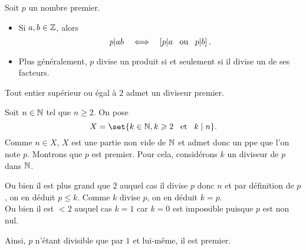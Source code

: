 \documentclass{magnolia}
\begin{document}


\begin{proposition}
Soit $p$ un nombre premier.
\begin{itemize}
\item Si $a,b\in\mathbb{Z}$, alors
  \[p|ab \quad\Longleftrightarrow\quad \left[p|a \quad\!\text{ou}\quad\! p|b\right].\]
\item Plus généralement, $p$ divise un produit si et seulement si il divise
  un de ses facteurs.
\end{itemize}
\end{proposition}

\begin{proposition}
Tout entier supérieur ou égal à $2$ admet un diviseur premier.  
\end{proposition}

\begin{preuve}
Soit $n\in \mathbb{N}$ tel que $n\geq 2$.
On pose $$X=\set{k\in \N, k\geq 2 \et k\mid n}.$$
Comme $n\in X$, $X$ est une partie non vide de $\mathbb{N}$ et admet donc un ppe que l'on note $p$. Montrons que $p$ est premier. Pour cela, considérons $k$ un diviseur de $p$ dans $\mathbb{N}$.

Ou bien il est plus grand que $2$ auquel cas il divise $p$ donc $n$ et par définition de $p$, on en déduit $p\leq k$. Comme $k$ divise $p$, on en déduit $k=p$.\\
Ou bien il est $<2$ auquel cas $k=1$ car $k=0$ est impossible puisque $p$ est non nul.

Ainsi, $p$ n'étant divisible que par $1$ et lui-même, il est premier.
\end{preuve}
\end{document}
